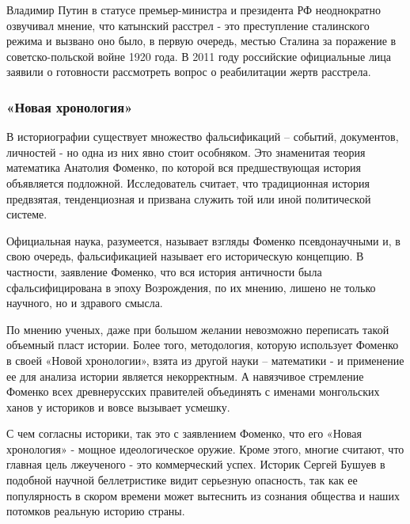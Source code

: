 Владимир Путин в статусе премьер-министра и президента РФ неоднократно
озвучивал мнение, что катынский расстрел - это преступление сталинского режима
и вызвано оно было, в первую очередь, местью Сталина за поражение в
советско-польской войне 1920 года. В 2011 году российские официальные лица
заявили о готовности рассмотреть вопрос о реабилитации жертв расстрела.  

\subsubsection{«Новая хронология»}

В историографии существует множество фальсификаций – событий, документов,
личностей - но одна из них явно стоит особняком. Это знаменитая теория
математика Анатолия Фоменко, по которой вся предшествующая история объявляется
подложной. Исследователь считает, что традиционная история предвзятая,
тенденциозная и призвана служить той или иной политической системе.

Официальная наука, разумеется, называет взгляды Фоменко псевдонаучными и, в
свою очередь, фальсификацией называет его историческую концепцию. В частности,
заявление Фоменко, что вся история античности была сфальсифицирована в эпоху
Возрождения, по их мнению, лишено не только научного, но и здравого смысла.

По мнению ученых, даже при большом желании невозможно переписать такой объемный
пласт истории. Более того, методология, которую использует Фоменко в своей
«Новой хронологии», взята из другой науки – математики - и применение ее для
анализа истории является некорректным. А навязчивое стремление Фоменко всех
древнерусских правителей объединять с именами монгольских ханов у историков и
вовсе вызывает усмешку.

С чем согласны историки, так это с заявлением Фоменко, что его «Новая
хронология» - мощное идеологическое оружие. Кроме этого, многие считают, что
главная цель лжеученого - это коммерческий успех. Историк Сергей Бушуев в
подобной научной беллетристике видит серьезную опасность, так как ее
популярность в скором времени может вытеснить из сознания общества и наших
потомков реальную историю страны.
